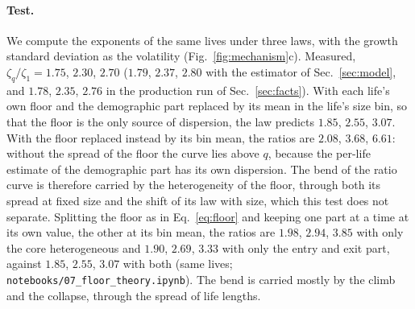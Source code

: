 \documentclass[pre,twocolumn,superscriptaddress,nofootinbib]{revtex4-2}
\begin{document}
\paragraph{Test.}  We compute the exponents of the same lives under three laws, with the growth
standard deviation as the volatility (Fig.~\ref{fig:mechanism}c).  Measured, $\zeta_q/\zeta_1=1.75$, $2.30$,
$2.70$ ($1.79$, $2.37$, $2.80$ with the estimator of Sec.~\ref{sec:model}, and $1.78$, $2.35$, $2.76$ in the
production run of Sec.~\ref{sec:facts}).  With each life's own floor and the demographic part replaced by its mean in the life's size
bin, so that the floor is the only source of dispersion, the law predicts $1.85$, $2.55$, $3.07$.  With
the floor replaced instead by its bin mean, the ratios are $2.08$, $3.68$, $6.61$: without the spread of
the floor the curve lies above $q$, because the per-life estimate of the demographic part has its own
dispersion.  The bend of the ratio curve is therefore carried by the heterogeneity of the floor, through
both its spread at fixed size and the shift of its law with size, which this test does not separate.
Splitting the floor as in Eq.~\eqref{eq:floor} and keeping one part at a time at its own value, the other at
its bin mean, the ratios are $1.98$, $2.94$, $3.85$ with only the core heterogeneous and $1.90$, $2.69$, $3.33$
with only the entry and exit part, against $1.85$, $2.55$, $3.07$ with both (same lives;
\texttt{notebooks/07\_floor\_theory.ipynb}).  The bend is carried mostly by the climb and the collapse,
through the spread of life lengths.
\end{document}
